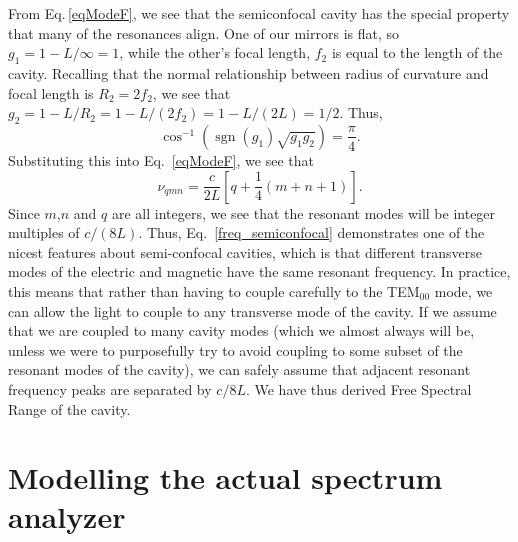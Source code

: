 From Eq.\,\ref{eqModeF}, we see that the semiconfocal cavity has the special property that many of the resonances align. One of our mirrors is flat, so $g_1=1-L/\infty=1$, while the other's focal length, $f_2$ is equal to the length of the cavity. Recalling that the normal relationship between radius of curvature and focal length is $R_2=2 f_2$, we see that $g_2=1-L/R_2=1-L/(2 f_2)=1-L/(2 L)=1/2$. Thus, 
\begin{equation}
\cos^{-1}(\operatorname{sgn}(g_1)\sqrt{g_1 g_2})=\frac{\pi}{4}.
\end{equation}
Substituting this into Eq.\ \ref{eqModeF}, we see that 
\begin{equation}\label{freq_semiconfocal}
\nu_{qmn}=\frac{c}{2L}\left[q + \frac{1}{4}(m+n+1)\right]. 
\end{equation}
Since $m$,$n$ and $q$ are all integers, we see that the resonant modes will be integer multiples of $c/(8L)$. Thus, Eq.\ \ref{freq_semiconfocal} demonstrates one of the nicest features about semi-confocal cavities, which is that different transverse modes of the electric and magnetic have the same resonant frequency. In practice, this means that rather than having to couple carefully to the TEM$_{00}$ mode, we can allow the light to couple to any transverse mode of the cavity. If we assume that we are coupled to many cavity modes (which we almost always will be, unless we were to purposefully try to avoid coupling to some subset of the resonant modes of the cavity), we can safely assume that adjacent resonant frequency peaks are separated by $c/8L$. We have thus derived Free Spectral Range of the cavity. 

\section{Modelling the actual spectrum analyzer}

